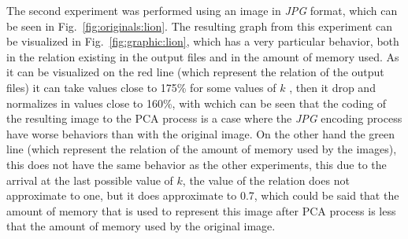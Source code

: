 \documentclass[journal]{IEEEtran}
\begin{document}

The second experiment was performed using an image in \textit{JPG} format, which can be seen in Fig.~\ref{fig:originals:lion}. The resulting graph from this experiment can be visualized in Fig.~\ref{fig:graphic:lion}, which has a very particular behavior, both in the relation existing in the output files and in the amount of memory used.
As it can be visualized on the red line (which represent the relation of the output files) it can take values close to 175\% for some values of $k$ , then it drop and normalizes in values close to 160\%, with wchich can be seen that the coding of the resulting image to the PCA process is a case where the \textit{JPG} encoding process have worse behaviors than with the original image.
On the other hand the green line (which represent the relation of the amount of memory used by the images), this does not have the same behavior as the other experiments, this due to the arrival at the last possible value of $k$, the value of the relation does not approximate to one, but it does approximate to 0.7, which could be said that the amount of memory that is used to represent this image after PCA process is less that the amount of memory used by the original image.
\end{document}
